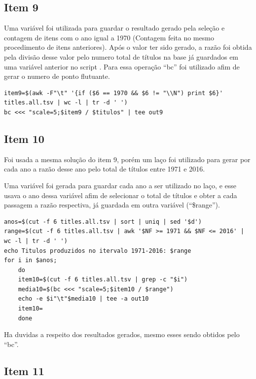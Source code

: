 \documentclass[12pt]{article}
\begin{document}
\subsection*{Item 9}

Uma variável foi utilizada para guardar o resultado gerado pela seleção e contagem de itens com o ano igual a 1970 (Contagem feita no mesmo procedimento de itens anteriores). Após o valor ter sido gerado, a razão foi obtida pela divisão desse valor pelo numero total de títulos na base já guardados em uma variável anterior no script . Para essa operação ``bc''  foi utilizado afim de gerar o numero de ponto flutuante.

\begin{verbatim}
item9=$(awk -F"\t" '{if ($6 == 1970 && $6 != "\\N") print $6}' titles.all.tsv | wc -l | tr -d ' ')
bc <<< "scale=5;$item9 / $titulos" | tee out9
\end{verbatim}

\subsection*{Item 10}

Foi usada a mesma solução do item 9, porém um laço foi utilizado para gerar por cada ano a razão desse ano pelo total de títulos entre 1971 e 2016.

Uma variável foi gerada para guardar cada ano a ser utilizado no laço, e esse usava o ano dessa variável afim de selecionar o total de títulos e obter a cada passagem a razão respectiva, já guardada em outra variável (``\$range'').

\begin{verbatim}
anos=$(cut -f 6 titles.all.tsv | sort | uniq | sed '$d')
range=$(cut -f 6 titles.all.tsv | awk '$NF >= 1971 && $NF <= 2016' | wc -l | tr -d ' ')
echo Titulos produzidos no itervalo 1971-2016: $range
for i in $anos;
	do
	item10=$(cut -f 6 titles.all.tsv | grep -c "$i")
	media10=$(bc <<< "scale=5;$item10 / $range")
	echo -e $i"\t"$media10 | tee -a out10
	item10=
	done
\end{verbatim}

Ha duvidas a respeito dos resultados gerados, mesmo esses sendo obtidos pelo ``bc''.

\subsection*{Item 11}
\end{document}
